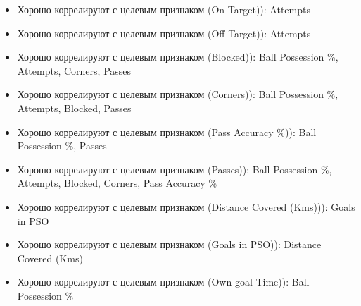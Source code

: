 \documentclass[11pt, a4paper]{report}
\providecommand{\tightlist}{%
      \setlength{\itemsep}{0pt}\setlength{\parskip}{0pt}}
\begin{document}
    
    \begin{itemize}
\tightlist
\item
  Хорошо коррелируют с целевым признаком (On-Target)): Attempts
\end{itemize}

    
    \begin{itemize}
\tightlist
\item
  Хорошо коррелируют с целевым признаком (Off-Target)): Attempts
\end{itemize}

    
    \begin{itemize}
\tightlist
\item
  Хорошо коррелируют с целевым признаком (Blocked)): Ball Possession \%,
  Attempts, Corners, Passes
\end{itemize}

    
    \begin{itemize}
\tightlist
\item
  Хорошо коррелируют с целевым признаком (Corners)): Ball Possession \%,
  Attempts, Blocked, Passes
\end{itemize}

    
    \begin{itemize}
\tightlist
\item
  Хорошо коррелируют с целевым признаком (Pass Accuracy \%)): Ball
  Possession \%, Passes
\end{itemize}

    
    \begin{itemize}
\tightlist
\item
  Хорошо коррелируют с целевым признаком (Passes)): Ball Possession \%,
  Attempts, Blocked, Corners, Pass Accuracy \%
\end{itemize}

    
    \begin{itemize}
\tightlist
\item
  Хорошо коррелируют с целевым признаком (Distance Covered (Kms))):
  Goals in PSO
\end{itemize}

    
    \begin{itemize}
\tightlist
\item
  Хорошо коррелируют с целевым признаком (Goals in PSO)): Distance
  Covered (Kms)
\end{itemize}

    
    \begin{itemize}
\tightlist
\item
  Хорошо коррелируют с целевым признаком (Own goal Time)): Ball
  Possession \%
\end{itemize}
\end{document}
